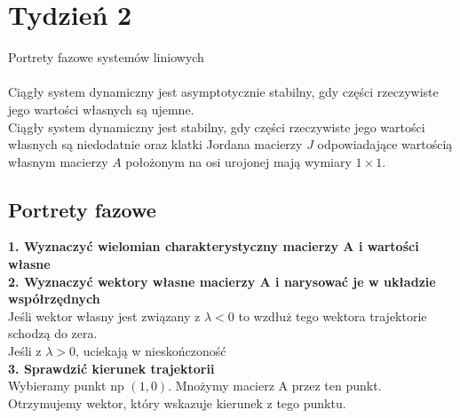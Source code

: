 \pagebreak
\section*{Tydzień 2}
Portrety fazowe systemów liniowych\\
\\
Ciągły system dynamiczny jest asymptotycznie stabilny, gdy części rzeczywiste jego wartości własnych są  ujemne.\\
Ciągły system dynamiczny jest stabilny, gdy części rzeczywiste jego wartości własnych są  niedodatnie oraz klatki Jordana macierzy $J$ odpowiadające wartością własnym macierzy $A$ położonym na osi urojonej mają wymiary $1\times 1$.
\subsection*{Portrety fazowe}
\textbf{1. Wyznaczyć wielomian charakterystyczny macierzy A i wartości własne}\\
\textbf{2. Wyznaczyć wektory własne macierzy A i narysować je w układzie współrzędnych}\\
Jeśli wektor własny jest związany z $\lambda<0$ to wzdłuż tego wektora trajektorie schodzą do zera.\\
Jeśli z $\lambda>0$, uciekają w nieskończoność\\
\textbf{3. Sprawdzić kierunek trajektorii}\\
Wybieramy punkt np $(1,0)$. Mnożymy macierz A przez ten punkt. Otrzymujemy wektor, który wskazuje kierunek z tego punktu.

